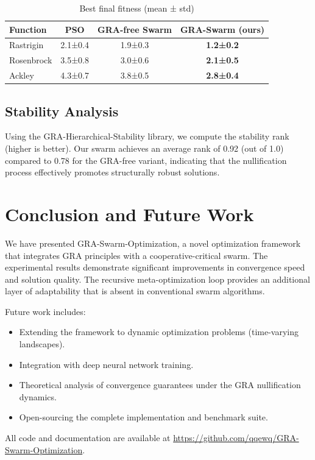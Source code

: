 \documentclass[12pt,a4paper]{article}
\begin{document}
\begin{table}[h]
\centering
\caption{Best final fitness (mean ± std)}
\label{tab:fitness}
\begin{tabular}{lccc}
\toprule
Function & PSO & GRA-free Swarm & GRA-Swarm (ours) \\
\midrule
Rastrigin & 2.1±0.4 & 1.9±0.3 & \textbf{1.2±0.2} \\
Rosenbrock & 3.5±0.8 & 3.0±0.6 & \textbf{2.1±0.5} \\
Ackley & 4.3±0.7 & 3.8±0.5 & \textbf{2.8±0.4} \\
\bottomrule
\end{tabular}
\end{table}

\subsection{Stability Analysis}
Using the GRA-Hierarchical-Stability library, we compute the stability rank (higher is better). Our swarm achieves an average rank of 0.92 (out of 1.0) compared to 0.78 for the GRA-free variant, indicating that the nullification process effectively promotes structurally robust solutions.

\section{Conclusion and Future Work}
We have presented GRA-Swarm-Optimization, a novel optimization framework that integrates GRA principles with a cooperative-critical swarm. The experimental results demonstrate significant improvements in convergence speed and solution quality. The recursive meta-optimization loop provides an additional layer of adaptability that is absent in conventional swarm algorithms.

Future work includes:
\begin{itemize}
    \item Extending the framework to dynamic optimization problems (time-varying landscapes).
    \item Integration with deep neural network training.
    \item Theoretical analysis of convergence guarantees under the GRA nullification dynamics.
    \item Open-sourcing the complete implementation and benchmark suite.
\end{itemize}

All code and documentation are available at \url{https://github.com/qqewq/GRA-Swarm-Optimization}.
\end{document}
